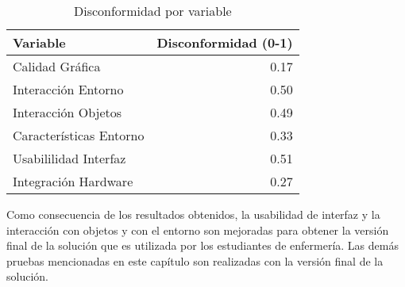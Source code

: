 \begin{table}[htb]
\centering
\begin{tabular}{lr}
\toprule
\textbf{Variable} & \textbf{Disconformidad (0-1)}\\
\midrule
Calidad Gráfica         & 0.17 \\
Interacción Entorno     & 0.50\\
Interacción Objetos     & 0.49\\
Características Entorno & 0.33\\
Usabililidad Interfaz   & 0.51\\
Integración Hardware    & 0.27\\
\bottomrule
\end{tabular}
\caption{Disconformidad por variable}
\label{tab:interfaz_disconformidad_metrica}
\end{table}


Como consecuencia de los resultados obtenidos, la usabilidad de interfaz y la interacción con objetos y 
con el entorno son mejoradas para obtener la versión final de la solución que es utilizada por 
los estudiantes de enfermería. Las demás pruebas mencionadas en este capítulo son realizadas con 
la versión final de la solución.

